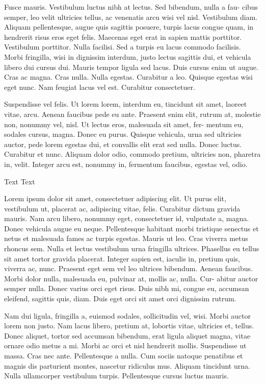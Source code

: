 \documentclass{book}
\begin{document}
Fusce mauris. Vestibulum luctus nibh at lectus. Sed bibendum, nulla a fau-
cibus semper, leo velit ultricies tellus, ac venenatis arcu wisi vel nisl. Vestibulum
diam. Aliquam pellentesque, augue quis sagittis posuere, turpis lacus congue
quam, in hendrerit risus eros eget felis. Maecenas eget erat in sapien mattis
porttitor. Vestibulum porttitor. Nulla facilisi. Sed a turpis eu lacus commodo
facilisis. Morbi fringilla, wisi in dignissim interdum, justo lectus sagittis dui, et
vehicula libero dui cursus dui. Mauris tempor ligula sed lacus. Duis cursus enim
ut augue. Cras ac magna. Cras nulla. Nulla egestas. Curabitur a leo. Quisque
egestas wisi eget nunc. Nam feugiat lacus vel est. Curabitur consectetuer.

Suspendisse vel felis. Ut lorem lorem, interdum eu, tincidunt sit amet,
laoreet vitae, arcu. Aenean faucibus pede eu ante. Praesent enim elit, rutrum
at, molestie non, nonummy vel, nisl. Ut lectus eros, malesuada sit amet, fer-
mentum eu, sodales cursus, magna. Donec eu purus. Quisque vehicula, urna sed
ultricies auctor, pede lorem egestas dui, et convallis elit erat sed nulla. Donec
luctus. Curabitur et nunc. Aliquam dolor odio, commodo pretium, ultricies
non, pharetra in, velit. Integer arcu est, nonummy in, fermentum faucibus,
egestas vel, odio.

Text Text

\mainmatter
 \newpage

Lorem ipsum dolor sit amet, consectetuer adipiscing elit. Ut purus elit,
vestibulum ut, placerat ac, adipiscing vitae, felis. Curabitur dictum gravida
mauris. Nam arcu libero, nonummy eget, consectetuer id, vulputate a, magna.
Donec vehicula augue eu neque. Pellentesque habitant morbi tristique senectus
et netus et malesuada fames ac turpis egestas. Mauris ut leo. Cras viverra
metus rhoncus sem. Nulla et lectus vestibulum urna fringilla ultrices. Phasellus
eu tellus sit amet tortor gravida placerat. Integer sapien est, iaculis in, pretium
quis, viverra ac, nunc. Praesent eget sem vel leo ultrices bibendum. Aenean
faucibus. Morbi dolor nulla, malesuada eu, pulvinar at, mollis ac, nulla. Cur-
abitur auctor semper nulla. Donec varius orci eget risus. Duis nibh mi, congue
eu, accumsan eleifend, sagittis quis, diam. Duis eget orci sit amet orci dignissim
rutrum.

Nam dui ligula, fringilla a, euismod sodales, sollicitudin vel, wisi. Morbi
auctor lorem non justo. Nam lacus libero, pretium at, lobortis vitae, ultricies et,
tellus. Donec aliquet, tortor sed accumsan bibendum, erat ligula aliquet magna,
vitae ornare odio metus a mi. Morbi ac orci et nisl hendrerit mollis. Suspendisse
ut massa. Cras nec ante. Pellentesque a nulla. Cum sociis natoque penatibus et
magnis dis parturient montes, nascetur ridiculus mus. Aliquam tincidunt urna.
Nulla ullamcorper vestibulum turpis. Pellentesque cursus luctus mauris.
\end{document}
